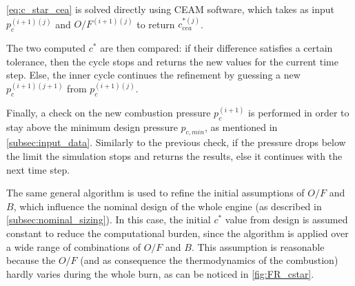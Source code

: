 \autoref{eq:c_star_cea} is solved directly using CEAM software, which takes as input $p_c ^ {(i+1)(j)}$ and $O/F ^ {(i+1)(j)}$ to return $c_{cea}^{*(j)}$.

The two computed $c^*$ are then compared: if their difference satisfies a certain tolerance, then the cycle stops and returns the new values for the current time step. Else, the inner cycle continues the refinement by guessing a new $p_c ^ {(i+1)(j+1)}$ from $p_c ^ {(i+1)(j)}$.

Finally, a check on the new combustion pressure $p_c ^ {(i+1)}$ is performed in order to stay above the minimum design pressure $p_{c,min}$, as mentioned in \autoref{subsec:input_data}. Similarly to the previous check, if the pressure drops below the limit the simulation stops and returns the results, else it continues with the next time step.

\vspace*{3mm}

The same general algorithm is used to refine the initial assumptions of $O/F$ and $B$, which influence the nominal design of the whole engine (as described in \autoref{subsec:nominal_sizing}).
In this case, the initial $c^*$ value from design is assumed constant to reduce the computational burden, since the algorithm is applied over a wide range of combinations of $O/F$ and $B$. This assumption is reasonable because the $O/F$ (and as consequence the thermodynamics of the combustion) hardly varies during the whole burn, as can be noticed in \autoref{fig:FR_cstar}.